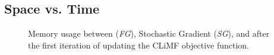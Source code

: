 \subsection{Space vs. Time}

\begin{figure}
\centerline{}
\caption[Memory usage after first iteration]{Memory usage between (\emph{FG}), Stochastic Gradient (\emph{SG}), and \tool after the first iteration of updating the CLiMF \cite{climf} objective function.}
\label{table:memory}
\end{figure}
